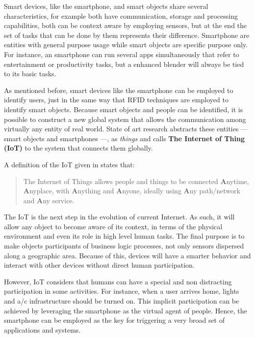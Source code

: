 \documentclass{report}
\begin{document}
Smart devices, like the smartphone, and smart objects share several characteristics, for example both have communication, storage and processing capabilities, both can be context aware by employing sensors, but at the end the set of tasks that can be done by them represents their difference.
Smartphone are entities with general purpose usage while smart objects are specific purpose only.
For instance, an smartphone can run several apps simultaneously that refer to entertainment or productivity tasks, but a enhanced blender will always be tied to its basic tasks.

As mentioned before, smart devices like the smartphone can be employed to identify users, just in the same way that RFID techniques are employed to identify smart objects.
Because smart objects and people can be identified, it is possible to construct a new global system that allows the communication among virtually any entity of real world.
State of art research abstracts these entities --- smart objects and smartphones ---, as \emph{things} and calls \textbf{The Internet of Thing (IoT)} to the system that connects them globally.

A definition of the IoT given in \citep{Sundmaeker2010} states that:

\begin{quotation}
The Internet of Things allows people and things to be connected \textbf{A}nytime, \textbf{A}nyplace, with \textbf{A}nything and \textbf{A}nyone, ideally using \textbf{A}ny path/network and \textbf{A}ny service.
\end{quotation}

The IoT is the next step in the evolution of current Internet.
As such, it will allow any object to become aware of its context, in terms of the physical environment and even its role in high level human tasks.
The final purpose is to make objects participants of business logic processes, not only sensors dispersed along a geographic area.
Because of this, devices will have a smarter behavior and interact with other devices without direct human participation.

However, IoT considers that humans can have a special and non distracting participation in some activities.
For instance, when a user arrives home, lights and a/c infrastructure should be turned on.
This implicit participation can be achieved by leveraging the smartphone as the virtual agent of people.
Hence, the smartphone can be employed as the key for triggering a very broad set of applications and systems.
\end{document}
